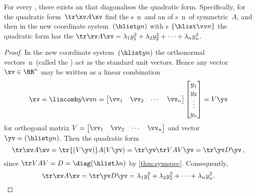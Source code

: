 \begin{theorem} \label{thm:patqform}
For every , there exists an   that diagonalises the quadratic form.
Specifically, for the quadratic form~\(\tr\xv A\xv\) find the 
s~\hlist\lambda n\ and an  of s~\hlist\vv n\ of symmetric~\(A\), and then in the new coordinate system~\((\hlist yn)\) with s \(\{\hlist\vv n\}\) the quadratic form has the  \(\tr\xv A\xv=\lambda_1y_1^2+\lambda_2y_2^2+\cdots+\lambda_ny_n^2\).
\end{theorem}

\begin{proof} 
In the new coordinate system~\((\hlist yn)\) the orthonormal vectors~\hlist\vv n\ (called the ) act as the standard unit vectors.
Hence any vector \(\xv\in\RR^n\) may be written as a linear combination
\begin{equation*}
\xv=\lincomb y\vv n
=\begin{bmatrix} \vv_1&\vv_2&\cdots&\vv_n \end{bmatrix}\begin{bmatrix} y_1\\y_2\\\vdots\\y_n \end{bmatrix}
=V\yv
\end{equation*}
for orthogonal matrix \(V=\begin{bmatrix} \vv_1&\vv_2&\cdots&\vv_n \end{bmatrix}\) and vector \(\yv=(\hlist yn)\).
Then the quadratic form 
\begin{equation*}
\tr\xv A\xv=\tr{(V\yv)} A(V\yv)=\tr\yv \tr VAV\yv=\tr\yv D\yv\,,
\end{equation*}
since \(\tr VAV=D=\diag(\hlist\lambda n)\) by \autoref{thm:symspec}.
Consequently,
\begin{equation*}
\tr\xv A\xv=\tr\yv D\yv=\lambda_1y_1^2+\lambda_2y_2^2+\cdots+\lambda_ny_n^2.
\end{equation*}
\end{proof}



\begin{comment}
Maybe applications to moment of inertia? and the rotating lunch box?
extreme stresses in a solid?
Could link to SVD and extreme values of length \(|A\xv|\): but where is it best established?
\end{comment}





